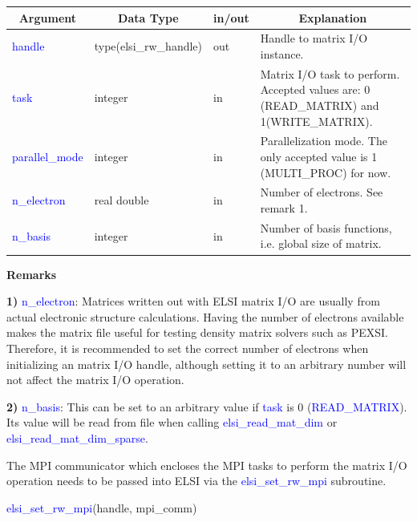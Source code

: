 \documentclass{report}
\begin{document}
\begin{tabular}[]{|p{20mm}|p{45mm}|p{15mm}|p{85mm}|}
\hline
\multicolumn{1}{|c|}{\textbf{Argument}} & \multicolumn{1}{c|}{\textbf{Data Type}} & \multicolumn{1}{c|}{\textbf{in/out}} & \multicolumn{1}{c|}{\textbf{Explanation}}\\
\hline
\textcolor{blue}{handle}         & type(elsi\_rw\_handle) & out & Handle to matrix I/O instance.\\
\hline
\textcolor{blue}{task}           & integer                & in  & Matrix I/O task to perform. Accepted values are: 0 (READ\_MATRIX) and 1(WRITE\_MATRIX).\\
\hline
\textcolor{blue}{parallel\_mode} & integer                & in  & Parallelization mode. The only accepted value is 1 (MULTI\_PROC) for now.\\
\hline
\textcolor{blue}{n\_electron}    & real double            & in  & Number of electrons. See remark 1.\\
\hline
\textcolor{blue}{n\_basis}       & integer                & in  & Number of basis functions, i.e. global size of matrix.\\
\hline
\end{tabular}

\textbf{Remarks}

\textbf{1)} \textcolor{blue}{n\_electron}: Matrices written out with ELSI matrix I/O are usually from actual electronic structure calculations. Having the number of electrons available makes the matrix file useful for testing density matrix solvers such as PEXSI. Therefore, it is recommended to set the correct number of electrons when initializing an matrix I/O handle, although setting it to an arbitrary number will not affect the matrix I/O operation.

\textbf{2)} \textcolor{blue}{n\_basis}: This can be set to an arbitrary value if \textcolor{blue}{task} is 0 (\textcolor{blue}{READ\_MATRIX}). Its value will be read from file when calling \textcolor{blue}{elsi\_read\_mat\_dim} or \textcolor{blue}{elsi\_read\_mat\_dim\_sparse}.

The MPI communicator which encloses the MPI tasks to perform the matrix I/O operation needs to be passed into ELSI via the \textcolor{blue}{elsi\_set\_rw\_mpi} subroutine.

\begin{labeling}{\hspace{6cm}}
\item [\hspace{0.3cm} \textcolor{blue}{elsi\_set\_rw\_mpi}(handle, mpi\_comm)]
\end{labeling}
\end{document}
